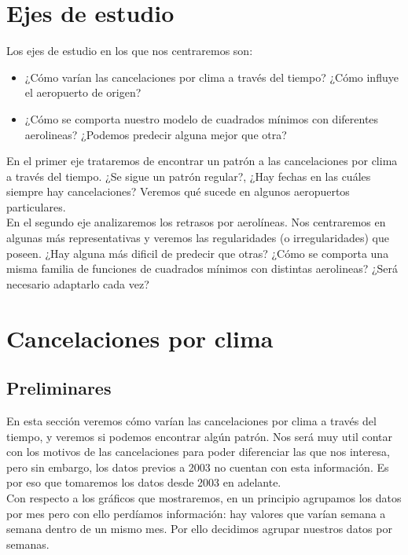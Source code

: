 \section{Ejes de estudio}

Los ejes de estudio en los que nos centraremos son:
\begin{itemize}
    \item ¿Cómo varían las cancelaciones por clima a través del tiempo? ¿Cómo influye el aeropuerto de origen?
    \item ¿Cómo se comporta nuestro modelo de cuadrados mínimos con diferentes aerolineas? ¿Podemos predecir alguna mejor que otra?
\end{itemize}


En el primer eje trataremos de encontrar un patrón a las cancelaciones por clima a través del tiempo. ¿Se sigue un patrón regular?, ¿Hay fechas en las cuáles siempre hay cancelaciones? Veremos qué sucede en algunos aeropuertos particulares. \\

En el segundo eje analizaremos los retrasos por aerolíneas. Nos centraremos en algunas más representativas y veremos las regularidades (o irregularidades) que poseen. ¿Hay alguna más dificil de predecir que otras? ¿Cómo se comporta una misma familia de funciones de cuadrados mínimos con distintas aerolineas? ¿Será necesario adaptarlo cada vez? \\

\section{Cancelaciones por clima}

\subsection{Preliminares}

En esta sección veremos cómo varían las cancelaciones por clima a través del tiempo, y veremos si podemos encontrar algún patrón. Nos será muy util contar con los motivos de las cancelaciones para poder diferenciar las que nos interesa, pero sin embargo, los datos previos a 2003 no cuentan con esta información. Es por eso que tomaremos los datos desde 2003 en adelante. \\

Con respecto a los gráficos que mostraremos, en un principio agrupamos los datos por mes pero con ello perdíamos información: hay valores que varían semana a semana dentro de un mismo mes. Por ello decidimos agrupar nuestros datos por semanas. \\

